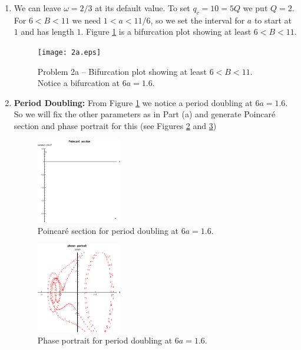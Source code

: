 \documentclass{article}
\theoremstyle{definition}
\begin{document}
\begin{enumerate}[label=(\alph*)]
	\item We can leave $\omega = 2/3$ at its default value. To set $q_c = 10 = 5 Q$ we put $Q = 2$.  For $6 < B < 11$ we need $1 < a < 11/6$, so we set the interval for $a$ to start at $1$ and has length $1$. Figure \ref{fig:problem-2a} is a bifurcation plot showing at least $6 < B < 11$. 
	
	\begin{figure}[!htb]
		\centering
		\texttt{[image: 2a.eps]}
		\caption{Problem 2a -- Bifurcation plot showing at least $6 < B < 11$. Notice a bifurcation at $6a = 1.6$.}
		\label{fig:problem-2a}
	\end{figure}
	
	\item \textbf{Period Doubling:} From Figure \ref{fig:problem-2a} we notice a period doubling at $6a = 1.6$. So we will fix the other parameters as in Part (a) and generate Poincar\'{e} section and phase portrait for this (see Figures \ref{fig:pd-poincare} and \ref{fig:pd-phase})
	
	\begin{figure}[!htb]
		\centering
		\includegraphics[width=0.35\textwidth]{pd-poincare.eps}
		\caption{Poincar\'{e} section for period doubling at $6a = 1.6$.}
		\label{fig:pd-poincare}
	\end{figure}

	\begin{figure}[!htb]
		\centering
		\includegraphics[width=0.35\textwidth]{pd-phase.eps}
		\caption{Phase portrait for period doubling at $6a = 1.6$.}
		\label{fig:pd-phase}
	\end{figure}
	

\end{enumerate}
\end{document}
